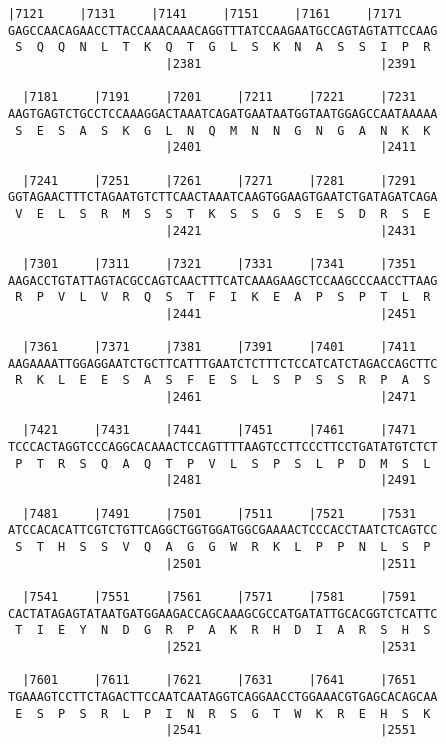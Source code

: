 \documentclass{article}
\begin{document}
\newpage
\begin{Verbatim}[fontfamily=courier]
  |7121     |7131     |7141     |7151     |7161     |7171   
GAGCCAACAGAACCTTACCAAACAAACAGGTTTATCCAAGAATGCCAGTAGTATTCCAAG
 S  Q  Q  N  L  T  K  Q  T  G  L  S  K  N  A  S  S  I  P  R 
                      |2381                         |2391   

  |7181     |7191     |7201     |7211     |7221     |7231   
AAGTGAGTCTGCCTCCAAAGGACTAAATCAGATGAATAATGGTAATGGAGCCAATAAAAA
 S  E  S  A  S  K  G  L  N  Q  M  N  N  G  N  G  A  N  K  K 
                      |2401                         |2411   

  |7241     |7251     |7261     |7271     |7281     |7291   
GGTAGAACTTTCTAGAATGTCTTCAACTAAATCAAGTGGAAGTGAATCTGATAGATCAGA
 V  E  L  S  R  M  S  S  T  K  S  S  G  S  E  S  D  R  S  E 
                      |2421                         |2431   

  |7301     |7311     |7321     |7331     |7341     |7351   
AAGACCTGTATTAGTACGCCAGTCAACTTTCATCAAAGAAGCTCCAAGCCCAACCTTAAG
 R  P  V  L  V  R  Q  S  T  F  I  K  E  A  P  S  P  T  L  R 
                      |2441                         |2451   

  |7361     |7371     |7381     |7391     |7401     |7411   
AAGAAAATTGGAGGAATCTGCTTCATTTGAATCTCTTTCTCCATCATCTAGACCAGCTTC
 R  K  L  E  E  S  A  S  F  E  S  L  S  P  S  S  R  P  A  S 
                      |2461                         |2471   

  |7421     |7431     |7441     |7451     |7461     |7471   
TCCCACTAGGTCCCAGGCACAAACTCCAGTTTTAAGTCCTTCCCTTCCTGATATGTCTCT
 P  T  R  S  Q  A  Q  T  P  V  L  S  P  S  L  P  D  M  S  L 
                      |2481                         |2491   

  |7481     |7491     |7501     |7511     |7521     |7531   
ATCCACACATTCGTCTGTTCAGGCTGGTGGATGGCGAAAACTCCCACCTAATCTCAGTCC
 S  T  H  S  S  V  Q  A  G  G  W  R  K  L  P  P  N  L  S  P 
                      |2501                         |2511   

  |7541     |7551     |7561     |7571     |7581     |7591   
CACTATAGAGTATAATGATGGAAGACCAGCAAAGCGCCATGATATTGCACGGTCTCATTC
 T  I  E  Y  N  D  G  R  P  A  K  R  H  D  I  A  R  S  H  S 
                      |2521                         |2531   

  |7601     |7611     |7621     |7631     |7641     |7651   
TGAAAGTCCTTCTAGACTTCCAATCAATAGGTCAGGAACCTGGAAACGTGAGCACAGCAA
 E  S  P  S  R  L  P  I  N  R  S  G  T  W  K  R  E  H  S  K 
                      |2541                         |2551   

\end{Verbatim}
\end{document}
